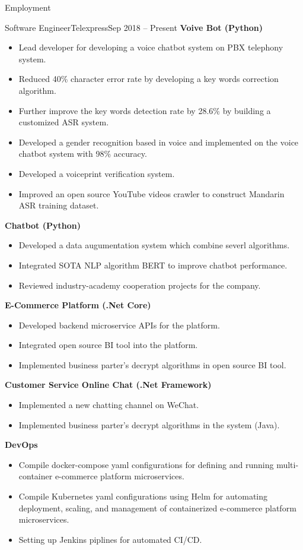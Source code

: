 \documentclass[]{mcdowellcv}
\begin{document}
	\makeheader
	
	\begin{cvsection}{Employment}
		\begin{cvsubsection}{Software Engineer}{Telexpress}{Sep 2018 -- Present}
			\textbf{Voive Bot (Python)}
			\begin{itemize}
				\item Lead developer for developing a voice chatbot system on PBX telephony system.
				\item Reduced 40\% character error rate by developing a key words correction algorithm.
				\item Further improve the key words detection rate by 28.6\% by building a customized ASR system.
				\item Developed a gender recognition based in voice and implemented on the voice chatbot system with 98\% accuracy.
				\item Developed a voiceprint verification system.
				\item Improved an open source YouTube videos crawler to construct Mandarin ASR training dataset.
			\end{itemize}
			\textbf{Chatbot (Python)}
			\begin{itemize}
				\item Developed a data augumentation system which combine severl algorithms.
				\item Integrated SOTA NLP algorithm BERT to improve chatbot performance.
				\item Reviewed industry-academy cooperation projects for the company.
			\end{itemize}
			\textbf{E-Commerce Platform (.Net Core)}
			\begin{itemize}
				\item Developed backend microservice APIs for the platform.
				\item Integrated open source BI tool into the platform.
				\item Implemented business parter's decrypt algorithms in open source BI tool.
			\end{itemize}
			\textbf{Customer Service Online Chat (.Net Framework)}
			\begin{itemize}
				\item Implemented a new chatting channel on WeChat.
				\item Implemented business parter's decrypt algorithms in the system (Java).
			\end{itemize}
			\textbf{DevOps}
			\begin{itemize}
				\item Compile docker-compose yaml configurations for defining and running multi-container e-commerce platform microservices.
				\item Compile Kubernetes yaml configurations using Helm for automating deployment, scaling, and management of containerized e-commerce platform microservices.
				\item Setting up Jenkins piplines for automated CI/CD.
			\end{itemize}
		\end{cvsubsection}
	\end{cvsection}
	
\end{document}
